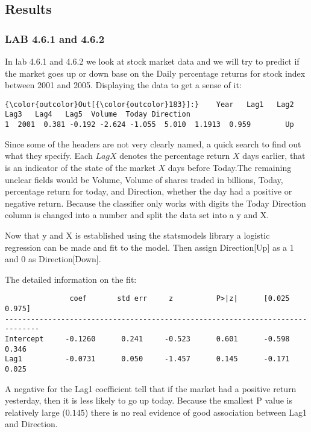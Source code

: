 
\subsection{Results}
\subsubsection*{LAB 4.6.1 and 4.6.2}
In lab 4.6.1 and 4.6.2 we look at stock market data and we will try to predict if the market goes up or down base on the Daily percentage returns for stock index between 2001 and 2005.
Displaying the data to get a sense of it:
\begin{Verbatim}[commandchars=\\\{\}]
{\color{outcolor}Out[{\color{outcolor}183}]:}    Year   Lag1   Lag2   Lag3   Lag4   Lag5  Volume  Today Direction
1  2001  0.381 -0.192 -2.624 -1.055  5.010  1.1913  0.959        Up
\end{Verbatim}
Since some of the headers are not very clearly named, a quick search to find out what they specify. Each $LagX$ denotes the percentage return $X$ days earlier, that is an indicator of the state of the market $X$ days before Today.The remaining unclear fields would be Volume, Volume of shares traded in billions, Today, percentage return for today, and Direction, whether the day had a positive or negative return. Because the classifier only works with digits the Today Direction column is changed into a number and split the data set into a y and X.

Now that y and X is established using the statsmodels library a logistic regression can be made and fit to the model. Then assign Direction[Up] as a $1$ and $0$ as Direction[Down].

The detailed information on the fit:
\begin{lstlisting}
               coef       std err     z          P>|z|      [0.025      0.975]
------------------------------------------------------------------------------
Intercept     -0.1260      0.241     -0.523      0.601      -0.598       0.346
Lag1          -0.0731      0.050     -1.457      0.145      -0.171       0.025
\end{lstlisting}
A negative for the Lag1 coefficient tell that if the market had a positive return yesterday, then it is less likely to go up today. Because the smallest P value is relatively large ($0.145$) there is no real evidence of good association between Lag1 and Direction.

